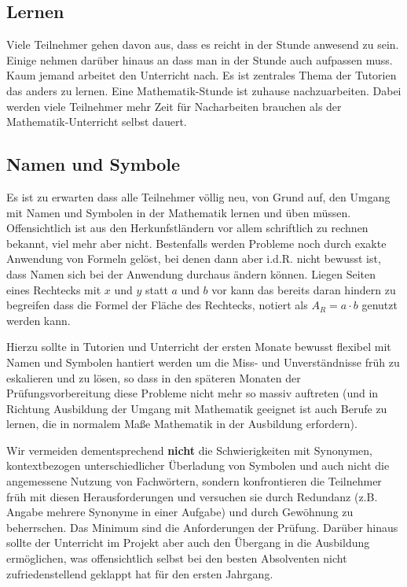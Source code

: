 \documentclass[a4paper]{book}%
\theoremstyle{definition}
\begin{document}
\subsection{Lernen}

Viele Teilnehmer gehen davon aus, dass es reicht in der Stunde anwesend zu sein. Einige nehmen darüber hinaus an dass man in der Stunde auch aufpassen muss. Kaum jemand arbeitet den Unterricht nach. Es ist zentrales Thema der Tutorien das anders zu lernen. Eine Mathematik-Stunde ist zuhause nachzuarbeiten. Dabei werden viele Teilnehmer mehr Zeit für Nacharbeiten brauchen als der Mathematik-Unterricht selbst dauert.


\subsection{Namen und Symbole}

Es ist zu erwarten dass alle Teilnehmer völlig neu, von Grund auf, den Umgang mit Namen und Symbolen in der Mathematik lernen und üben müssen. Offensichtlich ist aus den Herkunfstländern vor allem schriftlich zu rechnen bekannt, viel mehr aber nicht. Bestenfalls werden Probleme noch durch exakte Anwendung von Formeln gelöst, bei denen dann aber i.d.R. nicht bewusst ist, dass Namen sich bei der Anwendung durchaus ändern können. Liegen Seiten eines Rechtecks mit $x$ und $y$ statt $a$ und $b$ vor kann das bereits daran hindern zu begreifen dass die Formel der Fläche des Rechtecks, notiert als $A_R = a \cdot b$ genutzt werden kann.

Hierzu sollte in Tutorien und Unterricht der ersten Monate bewusst flexibel mit Namen und Symbolen hantiert werden um die Miss- und Unverständnisse früh zu eskalieren und zu lösen, so dass in den späteren Monaten der Prüfungsvorbereitung diese Probleme nicht mehr so massiv auftreten (und in Richtung Ausbildung der Umgang mit Mathematik geeignet ist auch Berufe zu lernen, die in normalem Maße Mathematik in der Ausbildung erfordern).

Wir vermeiden dementsprechend \textbf{nicht} die Schwierigkeiten mit Synonymen, kontextbezogen unterschiedlicher Überladung von Symbolen und auch nicht die angemessene Nutzung von Fachwörtern, sondern konfrontieren die Teilnehmer früh mit diesen Herausforderungen und versuchen sie durch Redundanz (z.B. Angabe mehrere Synonyme in einer Aufgabe) und durch Gewöhnung zu beherrschen. Das Minimum sind die Anforderungen der Prüfung. Darüber hinaus sollte der Unterricht im Projekt aber auch den Übergang in die Ausbildung ermöglichen, was offensichtlich selbst bei den besten Absolventen nicht zufriedenstellend geklappt hat für den ersten Jahrgang.
\end{document}
